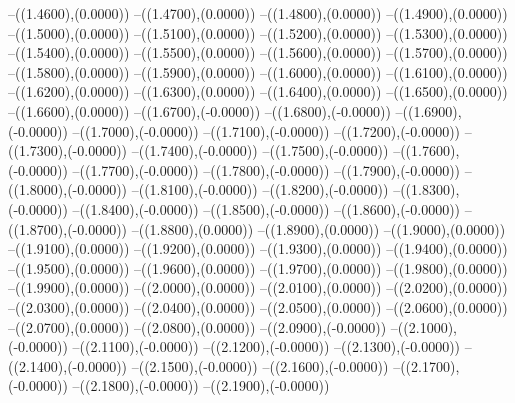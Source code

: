 {	--({\sx*(1.4600)},{\sy*(0.0000)})
	--({\sx*(1.4700)},{\sy*(0.0000)})
	--({\sx*(1.4800)},{\sy*(0.0000)})
	--({\sx*(1.4900)},{\sy*(0.0000)})
	--({\sx*(1.5000)},{\sy*(0.0000)})
	--({\sx*(1.5100)},{\sy*(0.0000)})
	--({\sx*(1.5200)},{\sy*(0.0000)})
	--({\sx*(1.5300)},{\sy*(0.0000)})
	--({\sx*(1.5400)},{\sy*(0.0000)})
	--({\sx*(1.5500)},{\sy*(0.0000)})
	--({\sx*(1.5600)},{\sy*(0.0000)})
	--({\sx*(1.5700)},{\sy*(0.0000)})
	--({\sx*(1.5800)},{\sy*(0.0000)})
	--({\sx*(1.5900)},{\sy*(0.0000)})
	--({\sx*(1.6000)},{\sy*(0.0000)})
	--({\sx*(1.6100)},{\sy*(0.0000)})
	--({\sx*(1.6200)},{\sy*(0.0000)})
	--({\sx*(1.6300)},{\sy*(0.0000)})
	--({\sx*(1.6400)},{\sy*(0.0000)})
	--({\sx*(1.6500)},{\sy*(0.0000)})
	--({\sx*(1.6600)},{\sy*(0.0000)})
	--({\sx*(1.6700)},{\sy*(-0.0000)})
	--({\sx*(1.6800)},{\sy*(-0.0000)})
	--({\sx*(1.6900)},{\sy*(-0.0000)})
	--({\sx*(1.7000)},{\sy*(-0.0000)})
	--({\sx*(1.7100)},{\sy*(-0.0000)})
	--({\sx*(1.7200)},{\sy*(-0.0000)})
	--({\sx*(1.7300)},{\sy*(-0.0000)})
	--({\sx*(1.7400)},{\sy*(-0.0000)})
	--({\sx*(1.7500)},{\sy*(-0.0000)})
	--({\sx*(1.7600)},{\sy*(-0.0000)})
	--({\sx*(1.7700)},{\sy*(-0.0000)})
	--({\sx*(1.7800)},{\sy*(-0.0000)})
	--({\sx*(1.7900)},{\sy*(-0.0000)})
	--({\sx*(1.8000)},{\sy*(-0.0000)})
	--({\sx*(1.8100)},{\sy*(-0.0000)})
	--({\sx*(1.8200)},{\sy*(-0.0000)})
	--({\sx*(1.8300)},{\sy*(-0.0000)})
	--({\sx*(1.8400)},{\sy*(-0.0000)})
	--({\sx*(1.8500)},{\sy*(-0.0000)})
	--({\sx*(1.8600)},{\sy*(-0.0000)})
	--({\sx*(1.8700)},{\sy*(-0.0000)})
	--({\sx*(1.8800)},{\sy*(0.0000)})
	--({\sx*(1.8900)},{\sy*(0.0000)})
	--({\sx*(1.9000)},{\sy*(0.0000)})
	--({\sx*(1.9100)},{\sy*(0.0000)})
	--({\sx*(1.9200)},{\sy*(0.0000)})
	--({\sx*(1.9300)},{\sy*(0.0000)})
	--({\sx*(1.9400)},{\sy*(0.0000)})
	--({\sx*(1.9500)},{\sy*(0.0000)})
	--({\sx*(1.9600)},{\sy*(0.0000)})
	--({\sx*(1.9700)},{\sy*(0.0000)})
	--({\sx*(1.9800)},{\sy*(0.0000)})
	--({\sx*(1.9900)},{\sy*(0.0000)})
	--({\sx*(2.0000)},{\sy*(0.0000)})
	--({\sx*(2.0100)},{\sy*(0.0000)})
	--({\sx*(2.0200)},{\sy*(0.0000)})
	--({\sx*(2.0300)},{\sy*(0.0000)})
	--({\sx*(2.0400)},{\sy*(0.0000)})
	--({\sx*(2.0500)},{\sy*(0.0000)})
	--({\sx*(2.0600)},{\sy*(0.0000)})
	--({\sx*(2.0700)},{\sy*(0.0000)})
	--({\sx*(2.0800)},{\sy*(0.0000)})
	--({\sx*(2.0900)},{\sy*(-0.0000)})
	--({\sx*(2.1000)},{\sy*(-0.0000)})
	--({\sx*(2.1100)},{\sy*(-0.0000)})
	--({\sx*(2.1200)},{\sy*(-0.0000)})
	--({\sx*(2.1300)},{\sy*(-0.0000)})
	--({\sx*(2.1400)},{\sy*(-0.0000)})
	--({\sx*(2.1500)},{\sy*(-0.0000)})
	--({\sx*(2.1600)},{\sy*(-0.0000)})
	--({\sx*(2.1700)},{\sy*(-0.0000)})
	--({\sx*(2.1800)},{\sy*(-0.0000)})
	--({\sx*(2.1900)},{\sy*(-0.0000)})
}
